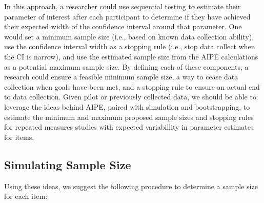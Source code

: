 \documentclass[
  man]{apa6}
\begin{document}
In this approach, a researcher could use sequential testing to estimate their parameter of interest after each participant to determine if they have achieved their expected width of the confidence interval around that parameter. One would set a minimum sample size (i.e., based on known data collection ability), use the confidence interval width as a stopping rule (i.e., stop data collect when the CI is narrow), and use the estimated sample size from the AIPE calculations as a potential maximum sample size. By defining each of these components, a research could ensure a feasible minimum sample size, a way to cease data collection when goals have been met, and a stopping rule to ensure an actual end to data collection. Given pilot or previously collected data, we should be able to leverage the ideas behind AIPE, paired with simulation and bootstrapping, to estimate the minimum and maximum proposed sample sizes and stopping rules for repeated measures studies with expected variabillity in parameter estimates for items.

\hypertarget{simulating-sample-size}{%
\subsection{Simulating Sample Size}\label{simulating-sample-size}}

Using these ideas, we suggest the following procedure to determine a sample size for each item:
\end{document}
